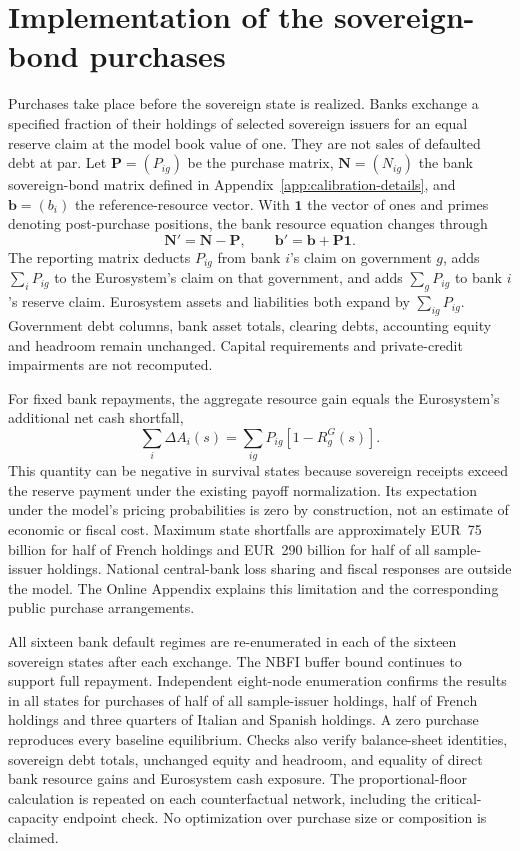 \section{Implementation of the sovereign-bond purchases}\label{app:purchase-implementation}

Purchases take place before the sovereign state is realized. Banks exchange a specified fraction of their holdings of selected sovereign issuers for an equal reserve claim at the model book value of one. They are not sales of defaulted debt at par. Let $\mathbf{P}=(P_{ig})$ be the purchase matrix, $\mathbf{N}=(N_{ig})$ the bank sovereign-bond matrix defined in Appendix~\ref{app:calibration-details}, and $\mathbf{b}=(b_i)$ the reference-resource vector. With $\mathbf1$ the vector of ones and primes denoting post-purchase positions, the bank resource equation changes through
\[
 \mathbf{N}'=\mathbf{N}-\mathbf{P},\qquad \mathbf{b}'=\mathbf{b}+\mathbf{P}\mathbf1.
\]
The reporting matrix deducts $P_{ig}$ from bank $i$'s claim on government $g$, adds $\sum_iP_{ig}$ to the Eurosystem's claim on that government, and adds $\sum_gP_{ig}$ to bank $i$'s reserve claim. Eurosystem assets and liabilities both expand by $\sum_{ig}P_{ig}$. Government debt columns, bank asset totals, clearing debts, accounting equity and headroom remain unchanged. Capital requirements and private-credit impairments are not recomputed.

For fixed bank repayments, the aggregate resource gain equals the Eurosystem's additional net cash shortfall,
\[
 \sum_i\Delta A_i(s)=\sum_{ig}P_{ig}[1-R_g^G(s)].
\]
This quantity can be negative in survival states because sovereign receipts exceed the reserve payment under the existing payoff normalization. Its expectation under the model's pricing probabilities is zero by construction, not an estimate of economic or fiscal cost. Maximum state shortfalls are approximately EUR~75 billion for half of French holdings and EUR~290 billion for half of all sample-issuer holdings. National central-bank loss sharing and fiscal responses are outside the model. The Online Appendix explains this limitation and the corresponding public purchase arrangements.

All sixteen bank default regimes are re-enumerated in each of the sixteen sovereign states after each exchange. The NBFI buffer bound continues to support full repayment. Independent eight-node enumeration confirms the results in all states for purchases of half of all sample-issuer holdings, half of French holdings and three quarters of Italian and Spanish holdings. A zero purchase reproduces every baseline equilibrium. Checks also verify balance-sheet identities, sovereign debt totals, unchanged equity and headroom, and equality of direct bank resource gains and Eurosystem cash exposure. The proportional-floor calculation is repeated on each counterfactual network, including the critical-capacity endpoint check. No optimization over purchase size or composition is claimed.
